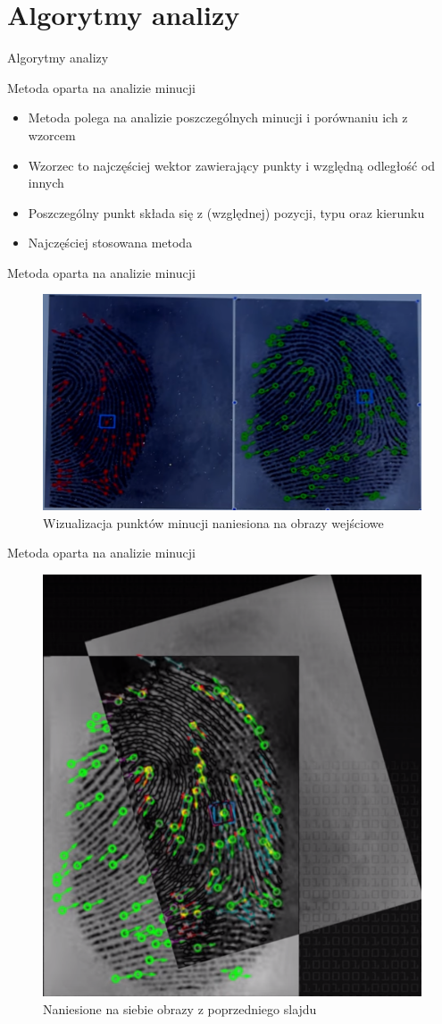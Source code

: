 \documentclass{beamer}
\begin{document}
\section{Algorytmy analizy}

\begin{frame}
    \centering
    \huge
    Algorytmy analizy
\end{frame}

\begin{frame}{Metoda oparta na analizie minucji}
    \begin{itemize}
    	\item Metoda polega na analizie poszczególnych minucji i porównaniu ich z wzorcem
        \item Wzorzec to najczęściej wektor zawierający punkty i względną odległość od innych
        \item Poszczególny punkt składa się z (względnej) pozycji, typu oraz kierunku
        \item Najczęściej stosowana metoda
	\end{itemize}
\end{frame}

\begin{frame}{Metoda oparta na analizie minucji}
    \begin{figure}[t]
        \centering
        \includegraphics[width=0.85\linewidth]{algorithms/minuncje.png}
        \caption{Wizualizacja punktów minucji naniesiona na obrazy wejściowe}
    \end{figure}
\end{frame}

\begin{frame}{Metoda oparta na analizie minucji}
    \begin{figure}[t]
        \centering
        \includegraphics[width=0.4\linewidth]{algorithms/minuncje1.png}
        \caption{Naniesione na siebie obrazy z poprzedniego slajdu}
    \end{figure}
\end{frame}
\end{document}
